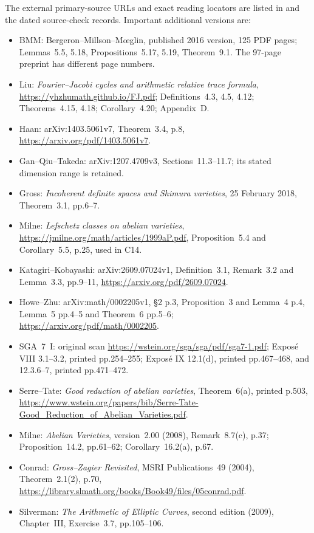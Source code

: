 The external primary-source URLs and exact reading locators are
listed in  and the
dated source-check records. Important additional versions are:
\begin{itemize}[leftmargin=*]
\item BMM: Bergeron--Millson--M\oe glin, published 2016 version,
125 PDF pages; Lemmas~5.5, 5.18, Propositions~5.17, 5.19,
Theorem~9.1. The 97-page preprint has different page numbers.
\item Liu: \emph{Fourier--Jacobi cycles and arithmetic relative
trace formula}, \url{https://yhzhumath.github.io/FJ.pdf};
Definitions~4.3, 4.5, 4.12; Theorems~4.15, 4.18;
Corollary~4.20; Appendix~D.
\item Haan: arXiv:1403.5061v7, Theorem~3.4, p.8,
\url{https://arxiv.org/pdf/1403.5061v7}.
\item Gan--Qiu--Takeda: arXiv:1207.4709v3,
Sections~11.3--11.7; its stated dimension range is retained.
\item Gross: \emph{Incoherent definite spaces and Shimura varieties},
25 February 2018, Theorem~3.1, pp.6--7.
\item Milne: \emph{Lefschetz classes on abelian varieties},
\url{https://jmilne.org/math/articles/1999aP.pdf},
Proposition~5.4 and Corollary~5.5, p.25, used in C14.
\item Katagiri--Kobayashi: arXiv:2609.07024v1,
Definition~3.1, Remark~3.2 and Lemma~3.3, pp.9--11,
\url{https://arxiv.org/pdf/2609.07024}.
\item Howe--Zhu: arXiv:math/0002205v1,
\S2 p.3, Proposition~3 and Lemma~4 p.4,
Lemma~5 pp.4--5 and Theorem~6 pp.5--6;
\url{https://arxiv.org/pdf/math/0002205}.
\item SGA~7~I: original scan
\url{https://wstein.org/sga/sga/pdf/sga7-1.pdf};
Expos\'e VIII 3.1--3.2, printed pp.254--255;
Expos\'e IX 12.1(d), printed pp.467--468, and
12.3.6--7, printed pp.471--472.
\item Serre--Tate: \emph{Good reduction of abelian varieties},
Theorem~6(a), printed p.503,
\url{https://www.wstein.org/papers/bib/Serre-Tate-Good_Reduction_of_Abelian_Varieties.pdf}.
\item Milne: \emph{Abelian Varieties}, version~2.00 (2008),
Remark~8.7(c), p.37; Proposition~14.2, pp.61--62;
Corollary~16.2(a), p.67.
\item Conrad: \emph{Gross--Zagier Revisited}, MSRI
Publications~49 (2004), Theorem~2.1(2), p.70,
\url{https://library.slmath.org/books/Book49/files/05conrad.pdf}.
\item Silverman: \emph{The Arithmetic of Elliptic Curves},
second edition (2009), Chapter~III, Exercise~3.7,
pp.105--106.
\end{itemize}


